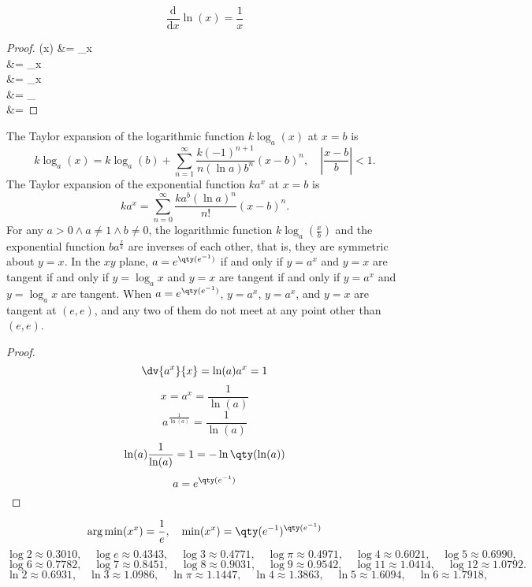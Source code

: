 \documentclass[a4paper,12pt]{article}
\begin{document}
\[\frac{\mathrm{d}}{\mathrm{d}x} \ln(x) = \frac{1}{x}\]
\begin{proof}
\bma
{} \ln(x) &= \lim_{\Delta x }  \\
&= \lim_{\Delta x } \\
&= \lim_{\Delta x } \\
&= \lim_{ }  \cdot {}\\
&= 
\eam
\end{proof}
The Taylor expansion of the logarithmic function $k\log_a(x)$ at $x=b$ is
\[k\log_a(x)=k\log_a(b)+\sum_{n=1}^{\infty}\frac{k(-1)^{n+1}}{n(\ln a)b^n}(x-b)^n,\quad\left|\frac{x-b}{b}\right|<1.\]
The Taylor expansion of the exponential function $ka^x$ at $x=b$ is
\[ka^x=\sum_{n=0}^{\infty}\frac{ka^b(\ln a)^n}{n!}(x-b)^n.\]
For any $a>0\land a\neq 1\land b\neq 0$, the logarithmic function $k\log_a\left(\frac{x}{b}\right)$ and the exponential function $ba^{\frac{x}{k}}$ are inverses of each other, that is, they are symmetric about $y=x$.
In the $xy$ plane, $a=e^{\qty(e^{-1})}$ if and only if $y=a^x$ and $y=x$ are tangent if and only if $y=\log_ax$ and $y=x$ are tangent if and only if $y=a^x$ and $y=\log_ax$ are tangent. When $a=e^{\qty(e^{-1})}$, $y=a^x$, $y=a^x$, and $y=x$ are tangent at $(e,e)$, and any two of them do not meet at any point other than $(e,e)$.
\begin{proof}
\[\dv{a^x}{x}=\ln(a)a^x=1\]
\[x=a^x=\frac{1}{\ln(a)}\]
\[a^{\frac{1}{\ln(a)}}=\frac{1}{\ln(a)}\]
\[\ln(a)\frac{1}{\ln(a)}=1=-\ln\qty(\ln(a))\]
\[a=e^{\qty(e^{-1})}\]
\end{proof}
\[\arg\min(x^x)=\frac{1}{e},\quad\min(x^x)=\qty(e^{-1})^{\qty(e^{-1})}\]
\[\log 2\approx 0.3010,\quad\log e\approx 0.4343,\quad\log 3\approx 0.4771,\quad\log\pi\approx 0.4971,\quad\log 4\approx 0.6021,\quad\log 5\approx 0.6990,\]
\[\log 6\approx 0.7782,\quad\log 7\approx 0.8451,\quad\log 8\approx 0.9031,\quad\log 9\approx 0.9542,\quad\log 11\approx 1.0414,\quad\log 12\approx 1.0792.\]
\[\ln 2\approx 0.6931,\quad\ln 3\approx 1.0986,\quad\ln\pi\approx 1.1447,\quad\ln 4\approx 1.3863,\quad\ln 5\approx 1.6094,\quad\ln 6\approx 1.7918,\]
\end{document}

